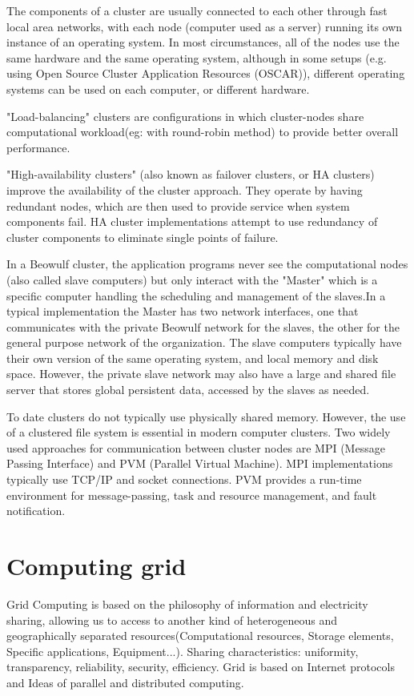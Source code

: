 \documentclass{article}
\begin{document}
The components of a cluster are usually connected to each other through fast local area networks, with each node (computer used as a server) running its own instance of an operating system. In most circumstances, all of the nodes use the same hardware and the same operating system, although in some setups (e.g. using Open Source Cluster Application Resources (OSCAR)), different operating systems can be used on each computer, or different hardware.

"Load-balancing" clusters are configurations in which cluster-nodes share computational workload(eg: with round-robin method) to provide better overall performance.\cite{sloan2004high}

"High-availability clusters" (also known as failover clusters, or HA clusters) improve the availability of the cluster approach. They operate by having redundant nodes, which are then used to provide service when system components fail. HA cluster implementations attempt to use redundancy of cluster components to eliminate single points of failure.

In a Beowulf cluster, the application programs never see the computational nodes (also called slave computers) but only interact with the "Master" which is a specific computer handling the scheduling and management of the slaves.\cite{dayde2005high}In a typical implementation the Master has two network interfaces, one that communicates with the private Beowulf network for the slaves, the other for the general purpose network of the organization. The slave computers typically have their own version of the same operating system, and local memory and disk space. However, the private slave network may also have a large and shared file server that stores global persistent data, accessed by the slaves as needed.

To date clusters do not typically use physically shared memory. However, the use of a clustered file system is essential in modern computer clusters. Two widely used approaches for communication between cluster nodes are MPI (Message Passing Interface) and PVM (Parallel Virtual Machine).\cite{milicchio2007distributed} MPI implementations typically use TCP/IP and socket connections. PVM provides a run-time environment for message-passing, task and resource management, and fault notification.




\section{Computing grid}
Grid Computing is based on the philosophy of information and electricity sharing, allowing us to access to another kind of heterogeneous and geographically separated resources(Computational resources, Storage elements, Specific applications, Equipment...). Sharing characteristics: uniformity, transparency, reliability, security, efficiency. Grid is based on Internet protocols and Ideas of parallel and distributed computing\cite{perezgrid}. 
\end{document}
